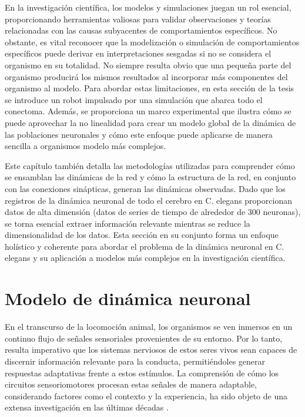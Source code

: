 En la investigación científica, los modelos y simulaciones juegan un rol esencial, proporcionando herramientas valiosas para validar observaciones y teorías relacionadas con las causas subyacentes de comportamientos específicos. No obstante, es vital reconocer que la modelización o simulación de comportamientos específicos puede derivar en interpretaciones sesgadas si no se considera el organismo en su totalidad. No siempre resulta obvio que una pequeña parte del organismo producirá los mismos resultados al incorporar más componentes del organismo al modelo. Para abordar estas limitaciones, en esta sección de la tesis se introduce un robot impulsado por una simulación que abarca todo el conectoma. Además, se proporciona un marco experimental que ilustra cómo se puede aprovechar la no linealidad para crear un modelo global de la dinámica de las poblaciones neuronales y cómo este enfoque puede aplicarse de manera sencilla a organismos modelo más complejos.


Este capítulo también detalla las metodologías utilizadas para comprender cómo se ensamblan las dinámicas de la red y cómo la estructura de la red, en conjunto con las conexiones sinápticas, generan las dinámicas observadas. Dado que los registros de la dinámica neuronal de todo el cerebro en C. elegans proporcionan datos de alta dimensión (datos de series de tiempo de alrededor de 300 neuronas), se torna esencial extraer información relevante mientras se reduce la dimensionalidad de los datos. Esta sección en su conjunto forma un enfoque holístico y coherente para abordar el problema de la dinámica neuronal en C. elegans y su aplicación a modelos más complejos en la investigación científica.




\section{Modelo de dinámica  neuronal}\label{sec:modelo_dinamica_neuronal}



En el transcurso de la locomoción animal, los organismos se ven inmersos en un continuo flujo de señales sensoriales provenientes de su entorno. Por lo tanto, resulta imperativo que los sistemas nerviosos de estos seres vivos sean capaces de discernir información relevante para la conducta, permitiéndoles generar respuestas adaptativas frente a estos estímulos. La comprensión de cómo los circuitos sensoriomotores procesan estas señales de manera adaptable, considerando factores como el contexto y la experiencia, ha sido objeto de una extensa investigación en las últimas décadas \cite{flavell_dynamic_2022}.

